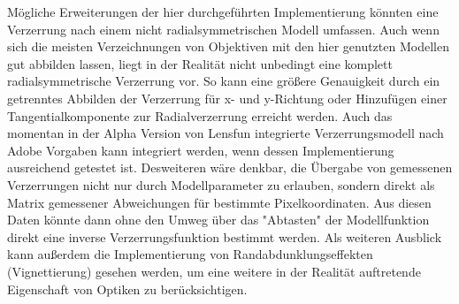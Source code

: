 Mögliche Erweiterungen der hier durchgeführten Implementierung könnten eine Verzerrung nach einem nicht radialsymmetrischen Modell umfassen. Auch wenn sich die meisten Verzeichnungen von Objektiven mit den hier genutzten Modellen gut abbilden lassen, liegt in der Realität nicht unbedingt eine komplett radialsymmetrische Verzerrung vor. So kann eine größere Genauigkeit durch ein getrenntes Abbilden der Verzerrung für x- und y-Richtung oder Hinzufügen einer Tangentialkomponente zur Radialverzerrung erreicht werden. Auch das momentan in der Alpha Version von Lensfun integrierte Verzerrungsmodell nach Adobe Vorgaben kann integriert werden, wenn dessen Implementierung ausreichend getestet ist. Desweiteren wäre denkbar, die Übergabe von gemessenen Verzerrungen nicht nur durch Modellparameter zu erlauben, sondern direkt als Matrix gemessener Abweichungen für bestimmte Pixelkoordinaten. Aus diesen Daten könnte dann ohne den Umweg über das "Abtasten" der Modellfunktion direkt eine inverse Verzerrungsfunktion bestimmt werden.
Als weiteren Ausblick kann außerdem die Implementierung von Randabdunklungseffekten (Vignettierung) gesehen werden, um eine weitere in der Realität auftretende Eigenschaft von Optiken zu berücksichtigen. 